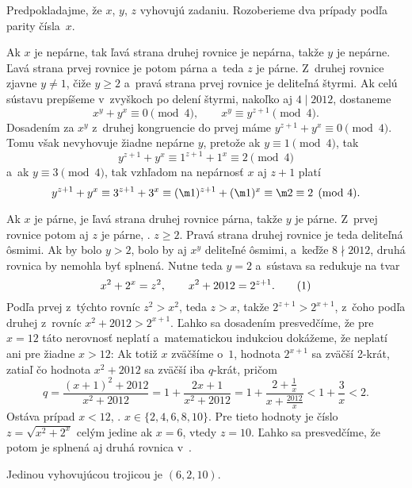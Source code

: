 {%
Predpokladajme, že $x$, $y$, $z$ vyhovujú zadaniu. Rozoberieme dva prípady podľa parity čísla~$x$.

\smallskip
Ak $x$ je nepárne, tak ľavá strana druhej rovnice je nepárna, takže $y$ je nepárne. Ľavá strana prvej rovnice je potom párna a~teda $z$ je párne.
Z~druhej rovnice zjavne $y\ne1$, čiže $y\ge2$ a~pravá strana prvej rovnice je deliteľná štyrmi. Ak celú sústavu prepíšeme v~zvyškoch po delení štyrmi, nakoľko aj $4\mid 2012$, dostaneme
$$
x^y+y^x\equiv 0\pmod4,\qquad x^y\equiv y^{z+1}\pmod4.
$$
Dosadením za $x^y$ z~druhej kongruencie do prvej máme $y^{z+1}+y^x\equiv0\pmod4$. Tomu však nevyhovuje žiadne nepárne $y$, pretože ak $y\equiv1\pmod4$, tak
$$
y^{z+1}+y^x\equiv1^{z+1}+1^x\equiv2\pmod4
$$
a~ak $y\equiv3\pmod4$, tak vzhľadom na nepárnosť $x$ aj $z+1$ platí
$$
y^{z+1}+y^x\equiv3^{z+1}+3^x\equiv(\m1)^{z+1}+(\m1)^x\equiv\m2\equiv2\pmod4.
$$

\smallskip
Ak $x$ je párne, je ľavá strana druhej rovnice párna, takže $y$ je párne. Z~prvej rovnice potom aj $z$ je párne, \tj. $z\ge2$. Pravá strana druhej rovnice je teda deliteľná ôsmimi. Ak by bolo $y>2$, bolo by aj $x^y$ deliteľné ôsmimi, a~keďže $8\nmid2012$, druhá rovnica by nemohla byť splnená. Nutne teda $y=2$ a~sústava sa redukuje na tvar
$$
x^2+2^x=z^2,\qquad x^2+2012=2^{z+1}.
\tag1
$$
Podľa prvej z~týchto rovníc $z^2>x^2$, teda $z>x$, takže $2^{z+1}>2^{x+1}$, z~čoho podľa druhej z~rovníc $x^2+2012>2^{x+1}$. Ľahko sa dosadením presvedčíme, že pre $x=12$ táto nerovnosť neplatí a~matematickou indukciou dokážeme, že neplatí ani pre žiadne $x>12$: Ak totiž $x$ zväčšíme o~$1$, hodnota $2^{x+1}$ sa zväčší 2-krát, zatiaľ čo hodnota $x^2+2012$ sa zväčší iba $q$-krát, pričom
$$
q=\frac{(x+1)^2+2012}{x^2+2012}=1+\frac{2x+1}{x^2+2012}=1+\frac{2+\frac1x}{x+\frac{2012}x}<1+\frac3x<2.
$$
Ostáva prípad $x<12$, \tj. $x\in\{2,4,6,8,10\}$. Pre tieto hodnoty je číslo $z=\sqrt{x^2+2^x}$ celým jedine ak $x=6$, vtedy $z=10$. Ľahko sa presvedčíme, že potom je splnená aj druhá rovnica v~.

\odpoved
Jedinou vyhovujúcou trojicou je $(6,2,10)$.
}

